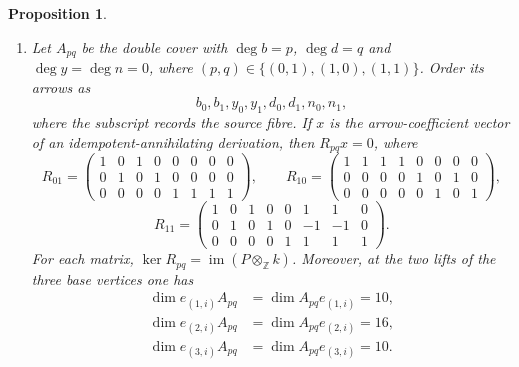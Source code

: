 \documentclass[11pt]{amsart}
\theoremstyle{plain}
\newtheorem{proposition}[theorem]{Proposition}
\theoremstyle{definition}
\newcommand{\ZZ}{\mathbb{Z}}
\begin{document}
\begin{proposition}
\begin{enumerate}
\item Let $A_{pq}$ be the double cover with $\deg b=p$, $\deg d=q$ and $\deg y=\deg n=0$, where
$(p,q)\in\{(0,1),(1,0),(1,1)\}$. Order its arrows as
\[
 b_0,b_1,y_0,y_1,d_0,d_1,n_0,n_1,
\]
where the subscript records the source fibre. If $x$ is the arrow-coefficient vector of an
idempotent-annihilating derivation, then $R_{pq}x=0$, where
\[
R_{01}=\begin{pmatrix}
1&0&1&0&0&0&0&0\\0&1&0&1&0&0&0&0\\0&0&0&0&1&1&1&1
\end{pmatrix},\qquad
R_{10}=\begin{pmatrix}
1&1&1&1&0&0&0&0\\0&0&0&0&1&0&1&0\\0&0&0&0&0&1&0&1
\end{pmatrix},
\]
\[
R_{11}=\begin{pmatrix}
1&0&1&0&0&1&1&0\\0&1&0&1&0&-1&-1&0\\0&0&0&0&1&1&1&1
\end{pmatrix}.
\]
For each matrix, $\ker R_{pq}=\operatorname{im}(P\otimes_\ZZ k)$. Moreover, at the two lifts of the three base
vertices one has
\[
\begin{aligned}
 \dim e_{(1,i)}A_{pq}&=\dim A_{pq}e_{(1,i)}=10,\\
 \dim e_{(2,i)}A_{pq}&=\dim A_{pq}e_{(2,i)}=16,\\
 \dim e_{(3,i)}A_{pq}&=\dim A_{pq}e_{(3,i)}=10.
\end{aligned}
\]
\end{enumerate}
\end{proposition}
\end{document}
